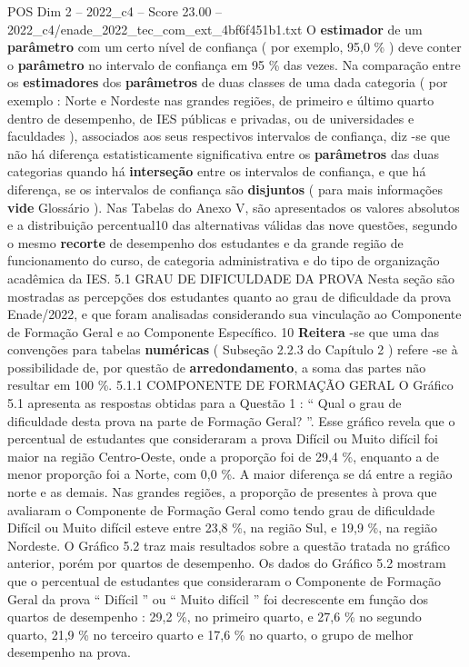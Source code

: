 \begin{textsample}{POS Dim 2 – 2022\_c4 – Score 23.00 – 2022\_c4/enade\_2022\_tec\_com\_ext\_4bf6f451b1.txt}
O \textbf{estimador} de um \textbf{parâmetro} com um certo nível de confiança ( por exemplo, 95,0 \% ) deve conter o \textbf{parâmetro} no intervalo de confiança em 95 \% das vezes.
Na comparação entre os \textbf{estimadores} dos \textbf{parâmetros} de duas classes de uma dada categoria ( por exemplo : Norte e Nordeste nas grandes regiões, de primeiro e último quarto dentro de desempenho, de IES públicas e privadas, ou de universidades e faculdades ), associados aos seus respectivos intervalos de confiança, diz -se que não há diferença estatisticamente significativa entre os \textbf{parâmetros} das duas categorias quando há \textbf{interseção} entre os intervalos de confiança, e que há diferença, se os intervalos de confiança são \textbf{disjuntos} ( para mais informações \textbf{vide} Glossário ).
Nas Tabelas do Anexo V, são apresentados os valores absolutos e a distribuição percentual10 das alternativas válidas das nove questões, segundo o mesmo \textbf{recorte} de desempenho dos estudantes e da grande região de funcionamento do curso, de categoria administrativa e do tipo de organização acadêmica da IES. 5.1 GRAU DE DIFICULDADE DA PROVA Nesta seção são mostradas as percepções dos estudantes quanto ao grau de dificuldade da prova Enade/2022, e que foram analisadas considerando sua vinculação ao Componente de Formação Geral e ao Componente Específico. 10 \textbf{Reitera} -se que uma das convenções para tabelas \textbf{numéricas} ( Subseção 2.2.3 do Capítulo 2 ) refere -se à possibilidade de, por questão de \textbf{arredondamento}, a soma das partes não resultar em 100 \%. 5.1.1 COMPONENTE DE FORMAÇÃO GERAL O Gráfico 5.1 apresenta as respostas obtidas para a Questão 1 : “ Qual o grau de dificuldade desta prova na parte de Formação Geral? ”.
Esse gráfico revela que o percentual de estudantes que consideraram a prova Difícil ou Muito difícil foi maior na região Centro-Oeste, onde a proporção foi de 29,4 \%, enquanto a de menor proporção foi a Norte, com 0,0 \%.
A maior diferença se dá entre a região norte e as demais.
Nas grandes regiões, a proporção de presentes à prova que avaliaram o Componente de Formação Geral como tendo grau de dificuldade Difícil ou Muito difícil esteve entre 23,8 \%, na região Sul, e 19,9 \%, na região Nordeste.
O Gráfico 5.2 traz mais resultados sobre a questão tratada no gráfico anterior, porém por quartos de desempenho.
Os dados do Gráfico 5.2 mostram que o percentual de estudantes que consideraram o Componente de Formação Geral da prova “ Difícil ” ou “ Muito difícil ” foi decrescente em função dos quartos de desempenho : 29,2 \%, no primeiro quarto, e 27,6 \% no segundo quarto, 21,9 \% no terceiro quarto e 17,6 \% no quarto, o grupo de melhor desempenho na prova.

\end{textsample}
